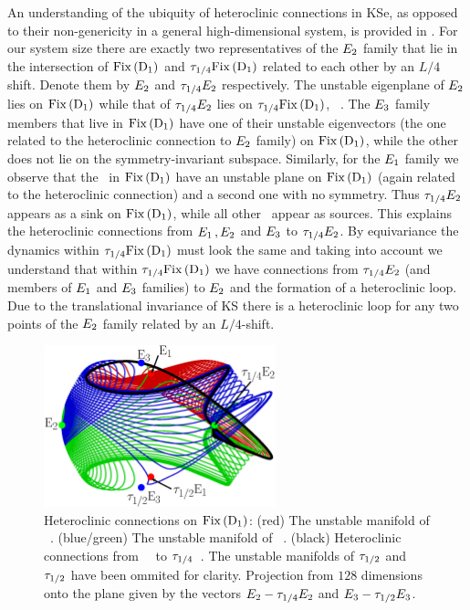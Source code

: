 An understanding of the ubiquity of heteroclinic connections in KSe, as
opposed to their non-genericity in a general high-dimensional system, is provided in .
For our system size
there are exactly two representatives
of the $E_{2}$ family that lie in the intersection of $\bbUplus$ and $\tau_{1/4}\mathrm{Fix}\left(\mathrm{D}_{1}\right)$ related
to each other by an $L/4$ shift. Denote them by $E_{2}$ and $\tau_{1/4}E_{2}$ respectively. The unstable eigenplane of
$E_{2}$ lies on $\bbUplus$ while that of $\tau_{1/4}E_{2}$ lies on $\tau_{1/4}\mathrm{Fix}\left(\mathrm{D}_{1}\right)$, \cf\ .
The $E_{3}$ family members that live in $\bbUplus$ have one of their unstable eigenvectors (the one related to the heteroclinic
connection to $E_{2}$ family)  on $\bbUplus$, while the other does not lie on the symmetry-invariant subspace.
Similarly, for the $E_{1}$ family we observe that the \eqva\ in $\bbUplus$ have
an unstable plane on $\bbUplus$ (again related to the heteroclinic connection) and a second one with no symmetry.
Thus $\tau_{1/4}E_{2}$ appears as a sink on $\bbUplus$, while all other \eqva\ appear as sources.
This explains the heteroclinic connections from $E_{1}\,,E_{2}$ and $E_{3}$ to $\tau_{1/4}E_{2}$.
By equivariance the dynamics within $\tau_{1/4} \mathrm{Fix}\left(\mathrm{D}_{1}\right)$ must look the same and taking into account  we understand that within $\tau_{1/4}\mathrm{Fix}\left(\mathrm{D}_{1}\right)$
we have connections from $\tau_{1/4}E_{2}$ (and members of $E_{1}$ and $E_{3}$ families) to $E_{2}$ and the
formation of a heteroclinic loop. Due to the translational invariance of KS there is a heteroclinic loop for any two points
of the $E_{2}$ family related by an $L/4$-shift.

\begin{figure}[h!t]
\begin{center}
         \includegraphics[width=0.6\textwidth]{../figs/KS22hetero}
\end{center}
\caption[Heteroclinic connections on $\bbUplus$]{
Heteroclinic connections on $\bbUplus$:
 (red) The unstable manifold of ~\eqv.
 (blue/green) The unstable manifold of ~\eqv.
 (black) Heteroclinic connections from ~\eqv\ to $\tau_{1/4}$~\eqv.
 The unstable manifolds of $\tau_{1/2}$ and $\tau_{1/2}$ have been ommited
 for clarity. Projection from $128$ dimensions onto the plane given by the vectors
 $E_{2}-\tau_{1/4}E_{2}$ and $E_{3}-\tau_{1/2}E_{3}$.}
\label{f:KS22hetero}
\end{figure}



